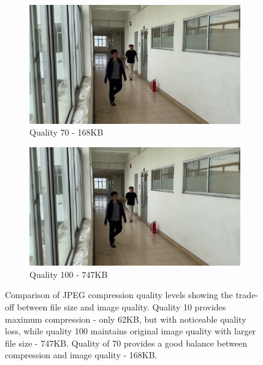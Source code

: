 \begin{figure}[htbp]
    \begin{subfigure}{0.45\textwidth}
        \centering
        \includegraphics[width=\textwidth]{Figure/frame_0_quality_70.jpg}
        \caption{Quality 70 - 168KB}
        \label{fig:quality_70}
    \end{subfigure}
    \hfill
    \begin{subfigure}{0.45\textwidth}
        \centering
        \includegraphics[width=\textwidth]{Figure/frame_0_quality_100.jpg}
        \caption{Quality 100 - 747KB}
        \label{fig:quality_100}
    \end{subfigure}
    
    \caption{Comparison of JPEG compression quality levels showing the trade-off between file size and image quality. Quality 10 provides maximum compression - only 62KB, but with noticeable quality loss, while quality 100 maintains original image quality with larger file size - 747KB. Quality of 70 provides a good balance between compression and image quality - 168KB.}
    \label{fig:jpeg_quality_comparison}
\end{figure}

